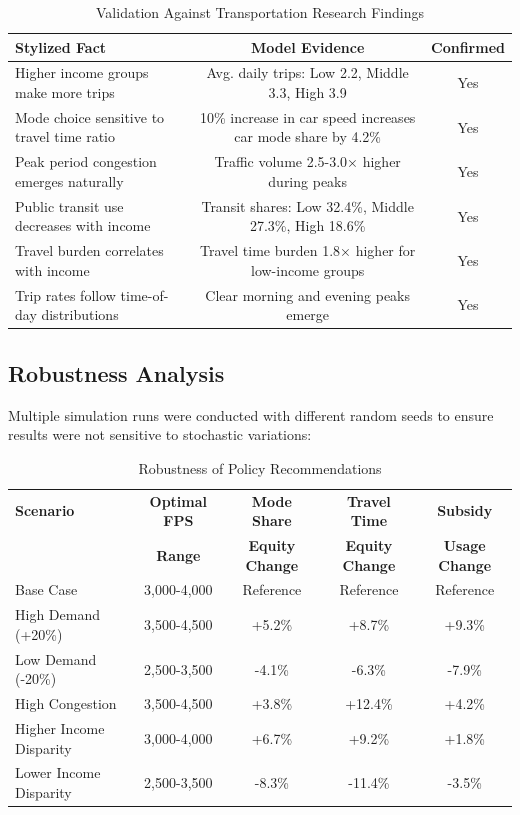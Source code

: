 \begin{table}[!ht]
\centering
\caption{Validation Against Transportation Research Findings}
\begin{tabular}{lcc}
\toprule
\textbf{Stylized Fact} & \textbf{Model Evidence} & \textbf{Confirmed} \\
\midrule
Higher income groups make more trips & Avg. daily trips: Low 2.2, Middle 3.3, High 3.9 & Yes \\
Mode choice sensitive to travel time ratio & 10\% increase in car speed increases car mode share by 4.2\% & Yes \\
Peak period congestion emerges naturally & Traffic volume 2.5-3.0× higher during peaks & Yes \\
Public transit use decreases with income & Transit shares: Low 32.4\%, Middle 27.3\%, High 18.6\% & Yes \\
Travel burden correlates with income & Travel time burden 1.8× higher for low-income groups & Yes \\
Trip rates follow time-of-day distributions & Clear morning and evening peaks emerge & Yes \\
\bottomrule
\end{tabular}
\end{table}

\subsection{Robustness Analysis}
Multiple simulation runs were conducted with different random seeds to ensure results were not sensitive to stochastic variations:

\begin{table}[!ht]
\centering
\caption{Robustness of Policy Recommendations}
\begin{tabular}{lcccc}
\toprule
\textbf{Scenario} & \textbf{Optimal FPS} & \textbf{Mode Share} & \textbf{Travel Time} & \textbf{Subsidy} \\
& \textbf{Range} & \textbf{Equity Change} & \textbf{Equity Change} & \textbf{Usage Change} \\
\midrule
Base Case & 3,000-4,000 & Reference & Reference & Reference \\
High Demand (+20\%) & 3,500-4,500 & +5.2\% & +8.7\% & +9.3\% \\
Low Demand (-20\%) & 2,500-3,500 & -4.1\% & -6.3\% & -7.9\% \\
High Congestion & 3,500-4,500 & +3.8\% & +12.4\% & +4.2\% \\
Higher Income Disparity & 3,000-4,000 & +6.7\% & +9.2\% & +1.8\% \\
Lower Income Disparity & 2,500-3,500 & -8.3\% & -11.4\% & -3.5\% \\
\bottomrule
\end{tabular}
\end{table}


